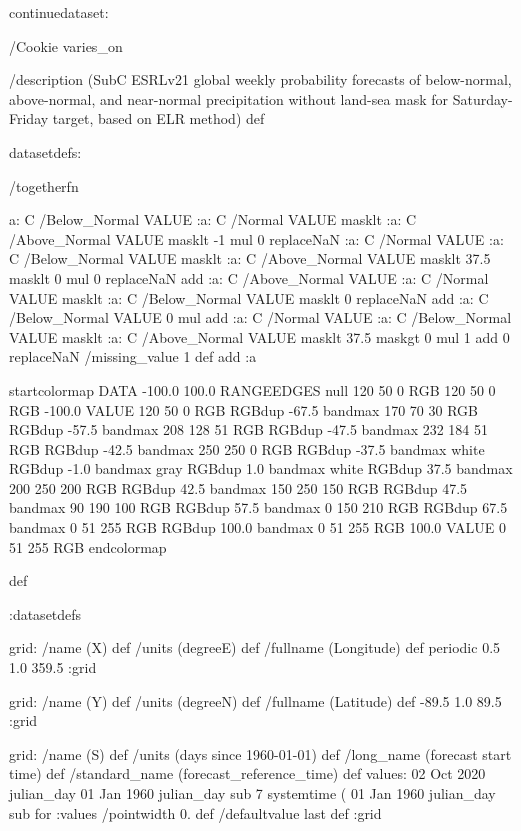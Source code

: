 \begin{ingrid}

continuedataset:



/Cookie varies_on

/description (SubC ESRLv21 global weekly probability forecasts of below-normal, above-normal, and near-normal precipitation without land-sea mask for Saturday-Friday target, based on ELR method) def

datasetdefs:

/togetherfn {
 a:
    C /Below_Normal VALUE
    :a:
     C /Normal VALUE
     masklt
    :a:
     C /Above_Normal VALUE
     masklt
    -1 mul
    0 replaceNaN
    :a:
     C /Normal VALUE
     :a:
      C /Below_Normal VALUE
      masklt
     :a:
      C /Above_Normal VALUE
      masklt
     37.5 masklt
     0 mul
     0 replaceNaN           
     add
    :a:
     C /Above_Normal VALUE
     :a:
      C /Normal VALUE
      masklt
     :a:
      C /Below_Normal VALUE
      masklt
     0 replaceNaN
     add
 :a:
     C /Below_Normal VALUE
     0 mul
     add
    :a:
     C /Normal VALUE
     :a:
      C /Below_Normal VALUE
      masklt
     :a:
      C /Above_Normal VALUE        
      masklt
     37.5 maskgt
     0 mul
     1 add
     0 replaceNaN
     /missing_value 1 def
     add
    :a

startcolormap
DATA -100.0 100.0 RANGEEDGES
null 120 50 0 RGB
120 50 0 RGB -100.0 VALUE
120 50 0 RGB RGBdup -67.5 bandmax
170 70 30 RGB RGBdup -57.5 bandmax
208 128 51 RGB RGBdup -47.5 bandmax
232 184 51 RGB RGBdup -42.5 bandmax
250 250 0 RGB RGBdup -37.5 bandmax
white RGBdup -1.0 bandmax
gray RGBdup 1.0 bandmax
white RGBdup 37.5 bandmax
200 250 200 RGB RGBdup 42.5 bandmax
150 250 150 RGB RGBdup 47.5 bandmax
90 190 100 RGB RGBdup 57.5 bandmax
0 150 210 RGB RGBdup 67.5 bandmax
0 51 255 RGB RGBdup 100.0 bandmax
0 51 255 RGB 100.0 VALUE
0 51 255 RGB
endcolormap
} def 

:datasetdefs


grid:
/name (X) def
/units (degreeE) def
/fullname (Longitude) def
periodic
0.5 1.0 359.5
:grid

grid:
/name (Y) def
/units (degreeN) def
/fullname (Latitude) def
-89.5 1.0 89.5
:grid


grid:
/name (S) def
/units (days since 1960-01-01) def
/long_name (forecast start time) def
/standard_name (forecast_reference_time) def
values:
02 Oct 2020 julian_day 01 Jan 1960 julian_day sub
7
systemtime
(%
01 Jan 1960 julian_day sub
{} for
:values
/pointwidth 0. def
/defaultvalue { last } def
:grid


\end{ingrid}
